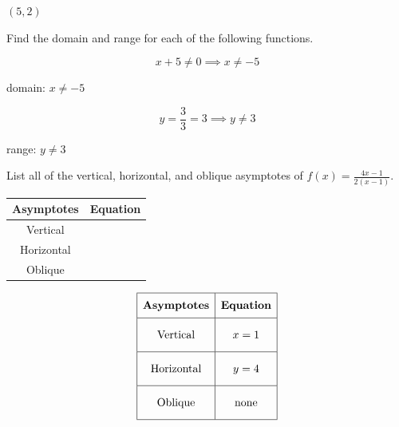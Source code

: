 \documentclass[addpoints]{exam}
\begin{document}
\begin{questions}
\begin{solution}
\(\boxed{ (5, 2) }\)
\end{solution}
\newpage


\question   Find the domain and range for each of the following functions.
\begin{parts}
    \part[5] \stxKnowl{
(a) \(g(x) = \displaystyle \frac{3x - 2}{3(x + 5)}\)
    \vspace{\stretch{1}}\\
domain:\fillin[\boxed{solution}][2in]\hspace{\stretch{1}}range:\fillin[\boxed{solution}][2in]
\end{parts}
\begin{solution}
\[x + 5 \neq 0 \implies x \neq -5\]

domain: \(\boxed{ x \neq -5 }\)

\[y = \frac{3}{3} = 3 \implies y \neq 3\]

range: \(\boxed{ y \neq 3 }\)
\end{solution}
\newpage
\newpage


\question[5]  List all of the vertical, horizontal, and oblique asymptotes of $f(x)=\frac{4x - 1}{2(x - 1)}$.\\
\begin{center}
\renewcommand{\arraystretch}{3}
    \begin{tabular}{|c|c|}
        \hline
        \textbf{Asymptotes}  & \textbf{Equation} \\ \hline
        Vertical   & \hspace{50mm}         \\ \hline
        Horizontal &          \\ \hline
        Oblique    &          \\ \hline
    \end{tabular}
\end{center}
\begin{solution}
\[\begin{array}{|c|c|} \hline \rule[-0.8em]{0pt}{2.2em} \textbf{Asymptotes} & \textbf{Equation} \\ \hline \rule[-1.2em]{0pt}{3em} \text{Vertical} & x = 1 \\ \hline \rule[-1.2em]{0pt}{3em} \text{Horizontal} & y = 4 \\ \hline \rule[-1.2em]{0pt}{3em} \text{Oblique} & \text{none} \\ \hline \end{array}\]
\end{solution}



\end{questions}
\end{document}
